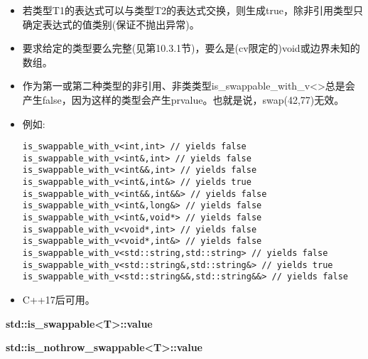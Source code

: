 \begin{itemize}
\item
若类型T1的表达式可以与类型T2的表达式交换，则生成true，除非引用类型只确定表达式的值类别(保证不抛出异常)。

\item
要求给定的类型要么完整(见第10.3.1节)，要么是(cv限定的)void或边界未知的数组。

\item
作为第一或第二种类型的非引用、非类类型is\_swappable\_with\_v<>总是会产生false，因为这样的类型会产生prvalue。也就是说，swap(42,77)无效。

\item
例如:
\begin{lstlisting}[style=styleCXX]
is_swappable_with_v<int,int> // yields false
is_swappable_with_v<int&,int> // yields false
is_swappable_with_v<int&&,int> // yields false
is_swappable_with_v<int&,int&> // yields true
is_swappable_with_v<int&&,int&&> // yields false
is_swappable_with_v<int&,long&> // yields false
is_swappable_with_v<int&,void*> // yields false
is_swappable_with_v<void*,int> // yields false
is_swappable_with_v<void*,int&> // yields false
is_swappable_with_v<std::string,std::string> // yields false
is_swappable_with_v<std::string&,std::string&> // yields true
is_swappable_with_v<std::string&&,std::string&&> // yields false
\end{lstlisting}

\item
C++17后可用。
\end{itemize}

\textbf{std::is\_swappable<T>::value}

\textbf{std::is\_nothrow\_swappable<T>::value}


